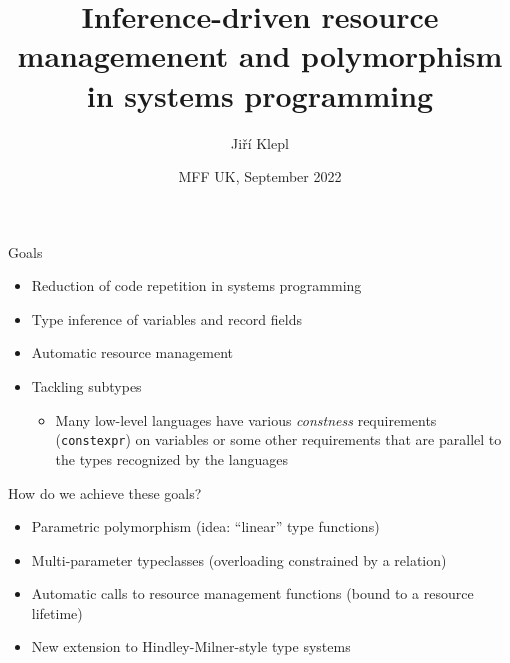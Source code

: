 \documentclass[aspectratio=169]{beamer}
\author{Jiří Klepl}
\title{Inference-driven resource managemenent and polymorphism in systems programming} %
\date{MFF UK, September 2022}
\newcommand{\li}[1]{\lstinline{#1}}
\begin{document}
\maketitle

%
%

\begin{frame}{Goals}
  \begin{itemize}
    \item Reduction of code repetition in systems programming
    \item Type inference of variables and record fields
    \item Automatic resource management
    \item Tackling subtypes
      \begin{itemize}
        \item Many low-level languages have various \emph{constness} requirements (\li{constexpr}) on variables or some other requirements that are parallel to the types recognized by the languages
      \end{itemize}
  \end{itemize}
  
  \pause
  
  How do we achieve these goals?
  
  \pause
  
  \begin{itemize}
    \item Parametric polymorphism (idea: ``linear'' type functions)
    \item Multi-parameter typeclasses (overloading constrained by a relation)
    \item Automatic calls to resource management functions (bound to a resource lifetime)
    \item New extension to Hindley-Milner-style type systems
  \end{itemize}
\end{frame}
\end{document}
